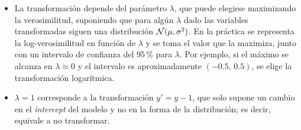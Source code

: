 \begin{itemize}
  \item La transformación depende del parámetro $\lambda$, que puede elegirse maximizando la
    verosimilitud, suponiendo que para algún $\lambda$ dado las variables transformadas siguen una
    distribución $\mathcal{N}(\mu,\sigma^2)$. En la práctica se representa la log-verosimilitud en
    función de $\lambda$ y se toma el valor que la maximiza, junto con un intervalo de confianza
    del 95\,\% para $\lambda$. Por ejemplo, si el máximo se alcanza en $\lambda\approx0$ y el
    intervalo es aproximadamente $(-0.5,\,0.5)$, se elige la transformación logarítmica.
  \item $\lambda=1$ corresponde a la transformación $y'=y-1$, que solo supone un cambio en el
    \emph{intercept} del modelo y no en la forma de la distribución; es decir, equivale a no
    transformar.
\end{itemize}
